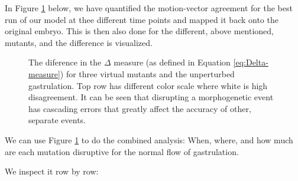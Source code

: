 In Figure \ref{fig:compare-motionAgreement-space} below, we have quantified the motion-vector agreement for the best run of our model at thee different time points and mapped it back onto the original embryo. This is then also done for the different, above mentioned, mutants, and the difference is visualized. 
\begin{figure}[H]
    \centering
    \caption{The diference in the $\Delta$ measure (as defined in Equation \ref{eq:Delta-measure}) for three virtual mutants and the unperturbed gastrulation. Top row has different color scale where white is high disagreement. 
    It can be seen that disrupting a morphogenetic event has cascading errors that greatly affect the accuracy of other, separate events.}
    \label{fig:compare-motionAgreement-space}
\end{figure}
\newpage

We can use Figure \ref{fig:compare-motionAgreement-space} to do the combined analysis: When, where, and how much are each mutation disruptive for the normal flow of gastrulation. 

We inspect it row by row:

